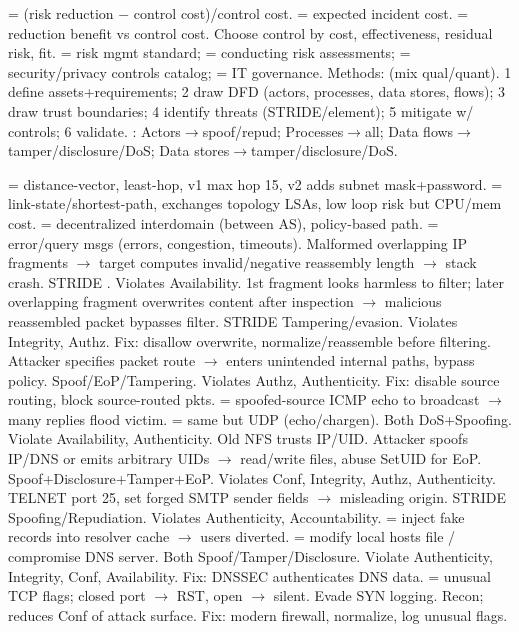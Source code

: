  = (risk reduction $-$ control cost)/control cost.  = expected incident cost.  = reduction benefit vs control cost. Choose control by cost, effectiveness, residual risk, fit.
 = risk mgmt standard;  = conducting risk assessments;  = security/privacy controls catalog;  = IT governance. Methods:  (mix qual/quant).
1 define assets+requirements; 2 draw DFD (actors, processes, data stores, flows); 3 draw trust boundaries; 4 identify threats (STRIDE/element); 5 mitigate w/ controls; 6 validate. : Actors$\to$spoof/repud; Processes$\to$all; Data flows$\to$tamper/disclosure/DoS; Data stores$\to$tamper/disclosure/DoS. 

 = distance-vector, least-hop, v1 max hop 15, v2 adds subnet mask+password.  = link-state/shortest-path, exchanges topology LSAs, low loop risk but CPU/mem cost.  = decentralized interdomain (between AS), policy-based path.  = error/query msgs (errors, congestion, timeouts).
Malformed overlapping IP fragments $\to$ target computes invalid/negative reassembly length $\to$ stack crash. STRIDE . Violates Availability.
1st fragment looks harmless to filter; later overlapping fragment overwrites content after inspection $\to$ malicious reassembled packet bypasses filter. STRIDE Tampering/evasion. Violates Integrity, Authz. Fix: disallow overwrite, normalize/reassemble before filtering.
Attacker specifies packet route $\to$ enters unintended internal paths, bypass policy. Spoof/EoP/Tampering. Violates Authz, Authenticity. Fix: disable source routing, block source-routed pkts.
 = spoofed-source ICMP echo to broadcast $\to$ many replies flood victim.  = same but UDP (echo/chargen). Both DoS+Spoofing. Violate Availability, Authenticity.
Old NFS trusts IP/UID. Attacker spoofs IP/DNS or emits arbitrary UIDs $\to$ read/write files, abuse SetUID for EoP. Spoof+Disclosure+Tamper+EoP. Violates Conf, Integrity, Authz, Authenticity.
TELNET port 25, set forged SMTP sender fields $\to$ misleading origin. STRIDE Spoofing/Repudiation. Violates Authenticity, Accountability.
 = inject fake records into resolver cache $\to$ users diverted.  = modify local hosts file / compromise DNS server. Both Spoof/Tamper/Disclosure. Violate Authenticity, Integrity, Conf, Availability. Fix: DNSSEC authenticates DNS data.
 = unusual TCP flags; closed port $\to$ RST, open $\to$ silent. Evade SYN logging. Recon; reduces Conf of attack surface. Fix: modern firewall, normalize, log unusual flags. 

